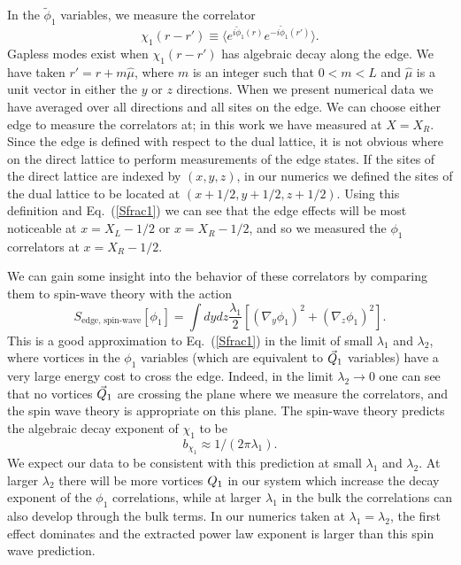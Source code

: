 In the $\tilde{\phi}_1$ variables, we measure the correlator
\begin{equation}
\chi_1(r-r')\equiv\langle e^{i\tilde{\phi}_1(r)}e^{-i\tilde{\phi}_1(r')}\rangle.
\label{Crr2}
\end{equation}
Gapless modes exist when $\chi_1(r-r')$ has algebraic decay along the edge. We have taken $r'=r+m\hat{\mu}$, where $m$ is an integer such that $0<m<L$ and $\hat{\mu}$ is a unit vector in either the $y$ or $z$ directions. When we present numerical data we have averaged over all directions and all sites on the edge. We can choose either edge to measure the correlators at; in this work we have measured at $X=X_R$.  Since the edge is defined with respect to the dual lattice, it is not obvious where on the direct lattice to perform measurements of the edge states.  If the sites of the direct lattice are indexed by $(x,y,z)$, in our numerics we defined the sites of the dual lattice to be located at $(x+1/2,y+1/2,z+1/2)$. Using this definition and Eq.~(\ref{Sfrac1}) we can see that the edge effects will be most noticeable at $x=X_L-1/2$ or $x=X_R-1/2$, and so we measured the $\phi_1$ correlators at $x=X_R-1/2$. 

We can gain some insight into the behavior of these correlators by comparing them to spin-wave theory with the action
\begin{equation*}
S_{\text{edge, spin-wave}}[\phi_1]=\int dydz \frac{\lambda_1}{2}\left[ (\nabla_y \phi_1)^2+(\nabla_z \phi_1)^2 \right].
\end{equation*}
This is a good approximation to Eq.~(\ref{Sfrac1}) in the limit of small $\lambda_1$ and $\lambda_2$, where vortices in the $\phi_1$ variables (which are equivalent to $\vec{Q}_1$ variables) have a very large energy cost to cross the edge. Indeed, in the limit $\lambda_2\rightarrow0$ one can see that no vortices $\vec{Q}_1$ are crossing the plane where we measure the correlators, and the spin wave theory is appropriate on this plane. The spin-wave theory predicts the algebraic decay exponent of $\chi_1$ to be 
\begin{equation}
b_{\chi_1} \approx 1/(2\pi\lambda_1).
\label{bchi1_sw}
\end{equation}
We expect our data to be consistent with this prediction at small $\lambda_1$ and $\lambda_2$. At larger $\lambda_2$ there will be more vortices $Q_1$ in our system which increase the decay exponent of the $\phi_1$ correlations, while at larger $\lambda_1$ in the bulk the correlations can also develop through the bulk terms. In our numerics taken at $\lambda_1 = \lambda_2$, the first effect dominates and the extracted power law exponent is larger than this spin wave prediction.

